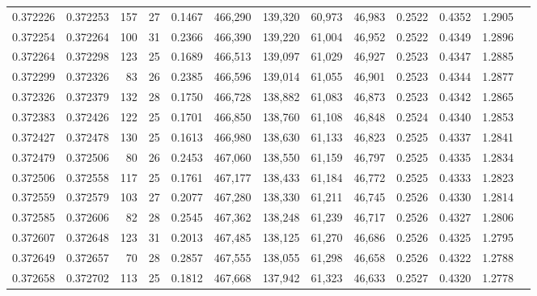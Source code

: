 \begin{tabular}{rrrrrrrrrrrrr}
0.372226 & 0.372253 &   157 &  27 &                                     0.1467 & 466,290 & 139,320 &  60,973 &  46,983 & 0.2522 & 0.4352 & 1.2905 \\
0.372254 & 0.372264 &   100 &  31 &                                     0.2366 & 466,390 & 139,220 &  61,004 &  46,952 & 0.2522 & 0.4349 & 1.2896 \\
0.372264 & 0.372298 &   123 &  25 &                                     0.1689 & 466,513 & 139,097 &  61,029 &  46,927 & 0.2523 & 0.4347 & 1.2885 \\
0.372299 & 0.372326 &    83 &  26 &                                     0.2385 & 466,596 & 139,014 &  61,055 &  46,901 & 0.2523 & 0.4344 & 1.2877 \\
0.372326 & 0.372379 &   132 &  28 &                                     0.1750 & 466,728 & 138,882 &  61,083 &  46,873 & 0.2523 & 0.4342 & 1.2865 \\
0.372383 & 0.372426 &   122 &  25 &                                     0.1701 & 466,850 & 138,760 &  61,108 &  46,848 & 0.2524 & 0.4340 & 1.2853 \\
0.372427 & 0.372478 &   130 &  25 &                                     0.1613 & 466,980 & 138,630 &  61,133 &  46,823 & 0.2525 & 0.4337 & 1.2841 \\
0.372479 & 0.372506 &    80 &  26 &                                     0.2453 & 467,060 & 138,550 &  61,159 &  46,797 & 0.2525 & 0.4335 & 1.2834 \\
0.372506 & 0.372558 &   117 &  25 &                                     0.1761 & 467,177 & 138,433 &  61,184 &  46,772 & 0.2525 & 0.4333 & 1.2823 \\
0.372559 & 0.372579 &   103 &  27 &                                     0.2077 & 467,280 & 138,330 &  61,211 &  46,745 & 0.2526 & 0.4330 & 1.2814 \\
0.372585 & 0.372606 &    82 &  28 &                                     0.2545 & 467,362 & 138,248 &  61,239 &  46,717 & 0.2526 & 0.4327 & 1.2806 \\
0.372607 & 0.372648 &   123 &  31 &                                     0.2013 & 467,485 & 138,125 &  61,270 &  46,686 & 0.2526 & 0.4325 & 1.2795 \\
0.372649 & 0.372657 &    70 &  28 &                                     0.2857 & 467,555 & 138,055 &  61,298 &  46,658 & 0.2526 & 0.4322 & 1.2788 \\
0.372658 & 0.372702 &   113 &  25 &                                     0.1812 & 467,668 & 137,942 &  61,323 &  46,633 & 0.2527 & 0.4320 & 1.2778 \\

\end{tabular}
